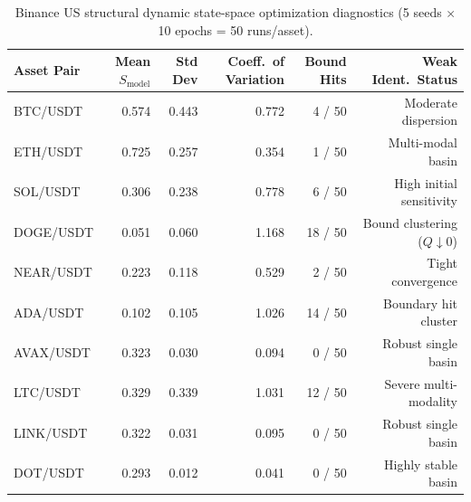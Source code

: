 \begin{table}[htbp]
\centering\small
\caption{Binance US structural dynamic state-space optimization diagnostics (5 seeds $\times$ 10 epochs = 50 runs/asset).}
\label{tab:T7_structural_diagnostics}
\begin{tabular}{lrrrrr}
\toprule
Asset Pair & Mean $S_{\mathrm{model}}$ & Std Dev & Coeff.\ of Variation & Bound Hits & Weak Ident.\ Status \\
\midrule
BTC/USDT & 0.574 & 0.443 & 0.772 & 4 / 50 & Moderate dispersion \\
ETH/USDT & 0.725 & 0.257 & 0.354 & 1 / 50 & Multi-modal basin \\
SOL/USDT & 0.306 & 0.238 & 0.778 & 6 / 50 & High initial sensitivity \\
DOGE/USDT & 0.051 & 0.060 & 1.168 & 18 / 50 & Bound clustering ($Q \downarrow 0$) \\
NEAR/USDT & 0.223 & 0.118 & 0.529 & 2 / 50 & Tight convergence \\
ADA/USDT & 0.102 & 0.105 & 1.026 & 14 / 50 & Boundary hit cluster \\
AVAX/USDT & 0.323 & 0.030 & 0.094 & 0 / 50 & Robust single basin \\
LTC/USDT & 0.329 & 0.339 & 1.031 & 12 / 50 & Severe multi-modality \\
LINK/USDT & 0.322 & 0.031 & 0.095 & 0 / 50 & Robust single basin \\
DOT/USDT & 0.293 & 0.012 & 0.041 & 0 / 50 & Highly stable basin \\
\bottomrule
\end{tabular}
\end{table}
